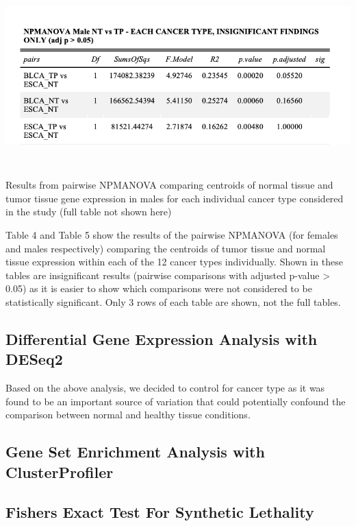 \documentclass[10pt]{article}
\begin{document}
	\begin{table}[!h]
		\centering
		\vspace{-0.4cm}\includegraphics[width=18cm, height=7cm]{eachmale_npmanova.png}
		\caption{Results from pairwise NPMANOVA comparing centroids of normal tissue and tumor tissue gene expression in males for each individual cancer type considered in the study (full table not shown here)}
		\label{table:5}
	\end{table}

	Table 4 and Table 5 show the results of the pairwise NPMANOVA (for females and males respectively) comparing the centroids of tumor tissue and normal tissue expression within each of the 12 cancer types individually. Shown in these tables are insignificant results (pairwise comparisons with adjusted p-value > 0.05) as it is easier to show which comparisons were not considered to be statistically significant. Only 3 rows of each table are shown, not the full tables.

	\subsection{Differential Gene Expression Analysis with DESeq2}
	
	Based on the above analysis, we decided to control for cancer type as it was found to be an important source of variation that could potentially confound the comparison between normal and healthy tissue conditions. 
	
	\subsection{Gene Set Enrichment Analysis with ClusterProfiler}

	\subsection{Fishers Exact Test For Synthetic Lethality}
\end{document}
